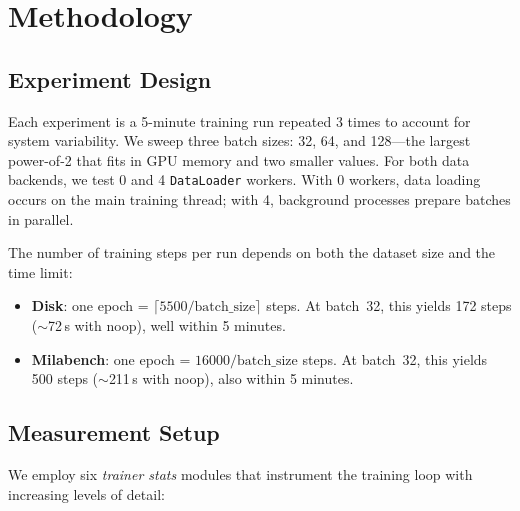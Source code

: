 \documentclass[10pt,twocolumn]{article}
\begin{document}
\section{Methodology}

\subsection{Experiment Design}

Each experiment is a 5-minute training run repeated 3 times to account for system variability. We sweep three batch sizes: 32, 64, and 128---the largest power-of-2 that fits in GPU memory and two smaller values. For both data backends, we test 0 and 4 \texttt{DataLoader} workers. With 0 workers, data loading occurs on the main training thread; with 4, background processes prepare batches in parallel.

The number of training steps per run depends on both the dataset size and the time limit:
\begin{itemize}
    \item \textbf{Disk}: one epoch = $\lceil 5500 / \text{batch\_size} \rceil$ steps. At batch~32, this yields 172 steps ($\sim$72\,s with noop), well within 5 minutes.
    \item \textbf{Milabench}: one epoch = $16000 / \text{batch\_size}$ steps. At batch~32, this yields 500 steps ($\sim$211\,s with noop), also within 5 minutes.
\end{itemize}

\subsection{Measurement Setup}

We employ six \emph{trainer stats} modules that instrument the training loop with increasing levels of detail:
\end{document}
